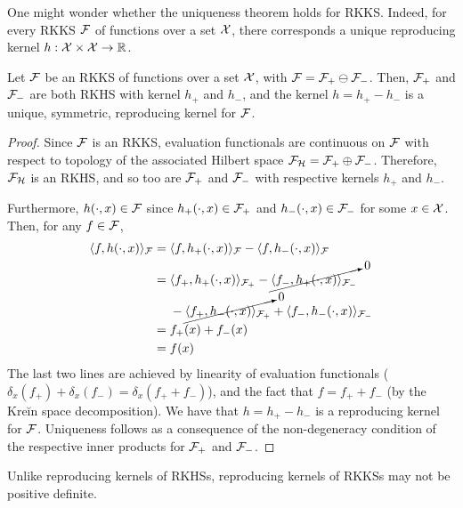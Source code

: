 One might wonder whether the uniqueness theorem  holds for RKKS.
Indeed, for every RKKS ${\mathcal F}$ of functions over a set ${\mathcal X}$, there corresponds a unique reproducing kernel $h:{\mathcal X}\times{\mathcal X}\to\mathbb{R}$.

\begin{lemma}
  Let ${\mathcal F}$ be an RKKS of functions over a set ${\mathcal X}$, with ${\mathcal F} = {\mathcal F}_+ \ominus {\mathcal F}_-$.
  Then, ${\mathcal F}_+$ and ${\mathcal F}_-$ are both RKHS with kernel $h_+$ and $h_-$, and the kernel $h = h_+ - h_-$ is a unique, symmetric, reproducing kernel for ${\mathcal F}$.  
\end{lemma}

\begin{proof}
  Since ${\mathcal F}$ is an RKKS, evaluation functionals are continuous on ${\mathcal F}$ with respect to topology of the associated Hilbert space ${\mathcal F}_{\mathcal H} = {\mathcal F}_+ \oplus {\mathcal F}_-$.
  Therefore, ${\mathcal F}_{\mathcal H}$ is an RKHS, and so too are ${\mathcal F}_+$ and ${\mathcal F}_-$ with respective kernels $h_+$ and $h_-$.
  
  Furthermore, $h(\cdot,x) \in{\mathcal F}$ since $h_+(\cdot,x) \in{\mathcal F}_+$ and $h_-(\cdot,x) \in{\mathcal F}_-$ for some $x\in{\mathcal X}$.
  Then, for any $f\in{\mathcal F}$,
  \begin{align*}
    \langle f, h(\cdot,x)\rangle_{\mathcal F} 
    ={}& \langle f, h_+(\cdot,x)\rangle_{{\mathcal F}} - \langle f, h_-(\cdot,x)\rangle_{{\mathcal F}} \\ 
    ={}& \langle f_+, h_+(\cdot,x)\rangle_{{\mathcal F}_+} - \cancelto{0}{\langle f_-, h_+(\cdot,x)\rangle_{{\mathcal F}_-}} \\
    & - \cancelto{0}{\langle f_+, h_-(\cdot,x)\rangle_{{\mathcal F}_+}} + \langle f_-, h_-(\cdot,x)\rangle_{{\mathcal F}_-} \\
    ={}& f_+(x) + f_-(x) \\
    ={}& f(x)
  \end{align*}
  The last two lines are achieved by linearity of evaluation functionals ($\delta_x(f_+) + \delta_x(f_-) = \delta_x(f_+ + f_-)$), and the fact that $f = f_+ + f_-$ (by the Kreĭn space decomposition).
  We have that $h=h_+ - h_-$ is a reproducing kernel for ${\mathcal F}$.
  Uniqueness follows as a consequence of the non-degeneracy condition of the respective inner products for ${\mathcal F}_+$ and ${\mathcal F}_-$.
\end{proof}

\begin{remark}
  Unlike reproducing kernels of RKHSs, reproducing kernels of RKKSs may not be positive definite.
\end{remark}

